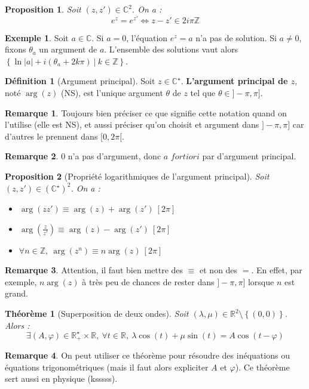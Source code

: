 \documentclass[french]{book}
\newcommand{\Z}{\mathbb{Z}}
\newcommand{\R}{\mathbb{R}}
\newcommand{\C}{\mathbb{C}}
\newcommand{\st}{^\star}
\theoremstyle{plain}
\newtheorem{thm}{Théorème}[chapter]
\newtheorem{prop}{Proposition}[chapter]
\theoremstyle{definition}
\newtheorem{dfn}{Définition}[chapter]
\newtheorem{exa}{Exemple}[chapter]
\newtheorem{rmq}{Remarque}[chapter]
\theoremstyle{remark}
\begin{document}
\begin{prop}
	Soit $(z,z')\in\C^2$. On a : $$e^z=e^{z'}\iff z-z'\in 2i\pi\Z$$
\end{prop}
\begin{exa}
	Soit $a\in\C$. Si $a=0$, l'équation $e^z=a$ n'a pas de solution. Si $a\ne0$, fixons $\theta_a$ un argument de $a$. L'ensemble des solutions vaut alors $\left\{\ln\lvert a\rvert +i(\theta_a+2k\pi)\ | \ k\in\Z\right\}$.
\end{exa}
\begin{dfn}[Argument principal]
	Soit $z\in\C\st$. \textbf{L'argument principal de $z$}, noté $\arg(z)$ (NS), est l'unique argument $\theta$ de $z$ tel que $\theta\in]-\pi,\pi]$.
\end{dfn}
\begin{rmq}
	Toujours bien préciser ce que signifie cette notation quand on l'utilise (elle est NS), et aussi préciser qu'on choisit et argument dans $]-\pi,\pi]$ car d'autres le prennent dans $[0,2\pi[$.
\end{rmq}
\begin{rmq}
	$0$ n'a pas d'argument, donc $a$ $fortiori$ par d'argument principal.
\end{rmq}
\begin{prop}[Propriété logarithmiques de l'argument principal]
	Soit $(z,z')\in(\C\st)^2$. On a : \begin{itemize}
		\item $\arg(zz')\equiv\arg(z)+\arg(z')\ [2\pi]$
		\item $\displaystyle\arg\left(\frac{z}{z'}\right)\equiv\arg(z)-\arg(z')\ [2\pi]$
		\item $\forall n\in\Z,\ \arg(z^n)\equiv n\arg(z)\ [2\pi]$
	\end{itemize}
\end{prop}
\begin{rmq}
	Attention, il faut bien mettre des $\equiv$ et non des $=$. En effet, par exemple, $n\arg(z)$ à très peu de chances de rester dans $]-\pi,\pi]$ lorsque $n$ est grand.
\end{rmq}
\begin{thm}[Superposition de deux ondes]
	Soit $(\lambda,\mu)\in\R^2\setminus\left\{(0,0)\right\}$. Alors : $$\exists(A,\varphi)\in\R_+\st\times\R,\ \forall t\in\R,\ \lambda\cos(t)+\mu\sin(t)=A\cos(t-\varphi)$$
\end{thm}
\begin{rmq}
	On peut utiliser ce théorème pour résoudre des inéquations ou équations trigonométriques (mais il faut alors expliciter $A$ et $\varphi$). Ce théorème sert aussi en physique (ksssss).
\end{rmq}
\end{document}
